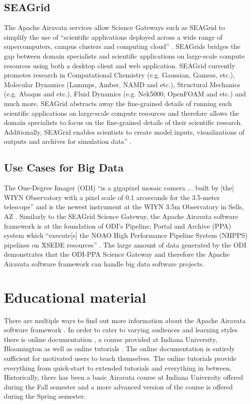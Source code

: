 \documentclass[9pt,twocolumn,twoside]{styles/osajnl}
\begin{document}
\subsection{SEAGrid} \label{seagrid}
The Apache Airavata services allow Science Gateways such as SEAGrid to
simplify the use of ``scientific applications deployed across a wide
range of supercomputers, campus clusters and computing cloud''
\cite{www-seagrid}. SEAGrids bridges the gap between domain
specialists and scientific applications on large-scale compute
resources using both a desktop client and web application. SEAGrid
currently promotes research in Computational Chemistry (e.g. Gaussian,
Gamess, etc.), Molecular Dynamics (Lammps, Amber, NAMD and etc.),
Structural Mechanics (e.g. Abaqus and etc.), Fluid Dynamics
(e.g. Nek5000, OpenFOAM and etc.) and much more. SEAGrid abstracts
away the fine-grained details of running such scientific applications
on large-scale compute resources and therefore allows the domain
specialists to focus on the fine-grained details of their scientific
research. Additionally, SEAGrid enables scientists to create model
inputs, visualizations of outputs and archives for simulation data''
\cite{www-seagrid}.

\subsection{Use Cases for Big Data} \label{big}
The One-Degree Imager (ODI) ``is a gigapixel mosaic camera ... built
by [the] WIYN Observatory with a pixel scale of 0.1 arcseconds for the
3.5-meter telescope'' and is the newest instrument at the WIYN 3.5m
Observatory in Sells, AZ \cite{www-odi, www-wiyn}. Similarly to the
SEAGrid Science Gateway, the Apache Airavata software framework is at
the foundation of ODI's Pipeline, Portal and Archive (PPA) system
which ``execute[s] the NOAO High Performance Pipeline System (NHPPS)
pipelines on XSEDE resources'' \cite{www-odi}. The large amount of
data generated by the ODI demonstrates that the ODI-PPA Science
Gateway and therefore the Apache Airavata software framework can
handle big data software projects. 

\section{Educational material} \label{educational}
There are multiple ways to find out more information about the Apache
Airavata software framework \cite{www-airavata}. In order to cater to
varying audiences and learning styles there is online documentation
\cite{www-documentation}, a course provided at Indiana University,
Bloomington \cite{www-class} as well as online tutorials
\cite{www-tutorial}. The online documentation is entirely sufficient
for motivated users to teach themselves. The online tutorials provide
everything from quick-start to extended tutorials and everything in
between. Historically, there has been a basic Airavata course at
Indiana University offered during the Fall semester and a more
advanced version of the course is offered during the Spring semester.
\end{document}

